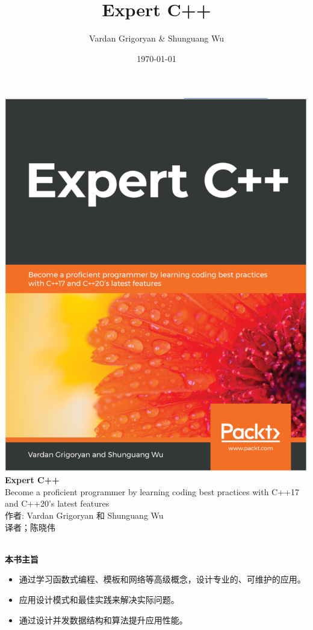 \documentclass[11pt,a4paper,UTF8]{ctexart}
\title{Expert C++}
\author{Vardan Grigoryan \& Shunguang Wu}
\date{\today}
\begin{document}
	
	\begin{center}
		\includegraphics[width=1\textwidth]{images/cover}
		\newpage
		\huge
		\textbf{Expert C++} 
		\\[9pt]
		\normalsize
		Become a proficient programmer by learning coding best practices with C++17 and C++20's latest features
		\\[10pt]
		\normalsize 
		作者: Vardan Grigoryan 和 Shunguang Wu
		\\[8pt]
		\normalsize
		译者；陈晓伟
	\end{center}

	
	\hspace*{\fill} \\ %
	\noindent\textbf{本书主旨}\ 
	\begin{itemize}
		\item 通过学习函数式编程、模板和网络等高级概念，设计专业的、可维护的应用。
		\item 应用设计模式和最佳实践来解决实际问题。
		\item 通过设计并发数据结构和算法提升应用性能。
	\end{itemize}
	
\end{document}
